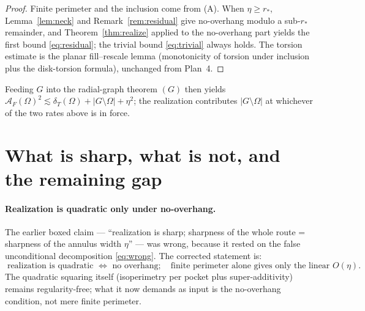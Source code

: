 \documentclass[11pt]{article}
\theoremstyle{definition}
\newcommand{\Om}{\Omega}
\newcommand{\dT}{\delta_T}
\newcommand{\AF}{\mathcal A_F}
\begin{document}
\begin{proof}
Finite perimeter and the inclusion come from (A). When $\eta\ge r_*$,
Lemma~\ref{lem:neck} and Remark~\ref{rem:residual} give no-overhang modulo
a sub-$r_*$ remainder, and Theorem~\ref{thm:realize} applied to the
no-overhang part yields the first bound \eqref{eq:residual}; the trivial
bound \eqref{eq:trivial} always holds. The torsion estimate is the planar
fill--rescale lemma (monotonicity of torsion under inclusion plus the
disk-torsion formula), unchanged from Plan~4.
\end{proof}

Feeding $G$ into the radial-graph theorem $(G)$ then yields
$\AF(\Om)^2\lesssim\dT(\Om)+|G\setminus\Om|+\eta^2$; the realization
contributes $|G\setminus\Om|$ at whichever of the two rates above is in
force.

\section{What is sharp, what is not, and the remaining gap}

\paragraph{Realization is quadratic only under no-overhang.} The earlier
boxed claim --- ``realization is sharp; sharpness of the whole route =
sharpness of the annulus width $\eta$'' --- was wrong, because it rested on
the false unconditional decomposition \eqref{eq:wrong}. The corrected
statement is:
\[
   \boxed{\;\text{realization is quadratic } \Longleftrightarrow \text{ no overhang};
   \quad\text{finite perimeter alone gives only the linear } O(\eta).\;}
\]
The quadratic squaring itself (isoperimetry per pocket plus
super-additivity) remains regularity-free; what it now demands as input is
the no-overhang condition, not mere finite perimeter.
\end{document}
